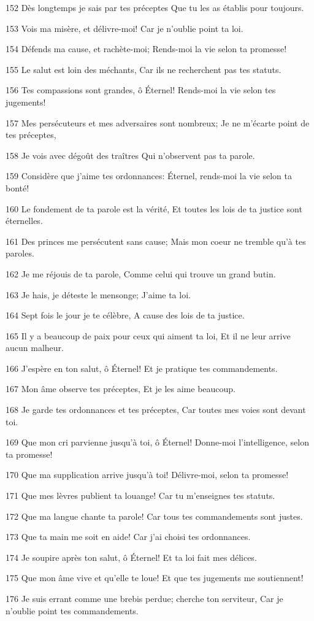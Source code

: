 \par 152 Dès longtemps je sais par tes préceptes Que tu les as établis pour toujours.
\par 153 Vois ma misère, et délivre-moi! Car je n'oublie point ta loi.
\par 154 Défends ma cause, et rachète-moi; Rends-moi la vie selon ta promesse!
\par 155 Le salut est loin des méchants, Car ils ne recherchent pas tes statuts.
\par 156 Tes compassions sont grandes, ô Éternel! Rends-moi la vie selon tes jugements!
\par 157 Mes persécuteurs et mes adversaires sont nombreux; Je ne m'écarte point de tes préceptes,
\par 158 Je vois avec dégoût des traîtres Qui n'observent pas ta parole.
\par 159 Considère que j'aime tes ordonnances: Éternel, rends-moi la vie selon ta bonté!
\par 160 Le fondement de ta parole est la vérité, Et toutes les lois de ta justice sont éternelles.
\par 161 Des princes me persécutent sans cause; Mais mon coeur ne tremble qu'à tes paroles.
\par 162 Je me réjouis de ta parole, Comme celui qui trouve un grand butin.
\par 163 Je hais, je déteste le mensonge; J'aime ta loi.
\par 164 Sept fois le jour je te célèbre, A cause des lois de ta justice.
\par 165 Il y a beaucoup de paix pour ceux qui aiment ta loi, Et il ne leur arrive aucun malheur.
\par 166 J'espère en ton salut, ô Éternel! Et je pratique tes commandements.
\par 167 Mon âme observe tes préceptes, Et je les aime beaucoup.
\par 168 Je garde tes ordonnances et tes préceptes, Car toutes mes voies sont devant toi.
\par 169 Que mon cri parvienne jusqu'à toi, ô Éternel! Donne-moi l'intelligence, selon ta promesse!
\par 170 Que ma supplication arrive jusqu'à toi! Délivre-moi, selon ta promesse!
\par 171 Que mes lèvres publient ta louange! Car tu m'enseignes tes statuts.
\par 172 Que ma langue chante ta parole! Car tous tes commandements sont justes.
\par 173 Que ta main me soit en aide! Car j'ai choisi tes ordonnances.
\par 174 Je soupire après ton salut, ô Éternel! Et ta loi fait mes délices.
\par 175 Que mon âme vive et qu'elle te loue! Et que tes jugements me soutiennent!
\par 176 Je suis errant comme une brebis perdue; cherche ton serviteur, Car je n'oublie point tes commandements.

